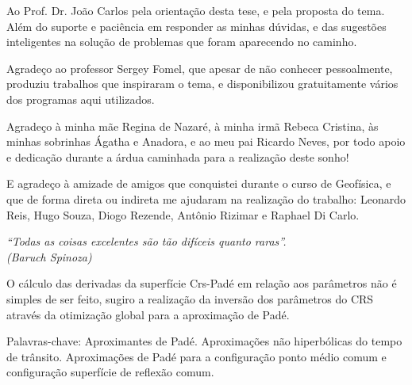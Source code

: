 \documentclass[
	12pt,				%
	openright,			%
	oneside,			%
	a4paper,			%
	english,			%
	brazil				%
	]{abntex2}
\begin{document}
\begin{agradecimentos}
\vspace*{1.5cm}

Ao Prof. Dr. João Carlos pela orientação desta tese, e pela proposta do tema. Além
do suporte e paciência em responder as minhas dúvidas, e das sugestões inteligentes na solução de problemas
que foram aparecendo no caminho.

Agradeço ao professor Sergey Fomel, que apesar de não conhecer pessoalmente, produziu trabalhos
que inspiraram o tema, e disponibilizou gratuitamente
vários
dos programas aqui utilizados.

Agradeço à minha mãe Regina de Nazaré,
à minha irmã Rebeca Cristina, às minhas sobrinhas Ágatha e Anadora, e ao meu pai Ricardo Neves, por todo apoio e dedicação
durante a árdua caminhada para a realização deste sonho!

E agradeço à amizade de amigos que conquistei durante o curso de Geofísica, e que de forma direta ou indireta
me ajudaram na realização do trabalho:
Leonardo Reis, Hugo Souza, Diogo Rezende, Antônio Rizimar e Raphael Di Carlo.

\end{agradecimentos}

\begin{epigrafe}
    \vspace*{\fill}
	\begin{flushright}
		\textit{``Todas as coisas excelentes são tão difíceis quanto raras''. \\
		(Baruch Spinoza)}
	\end{flushright}
\end{epigrafe}


\begin{resumo}
\OnehalfSpacing	%
O cálculo das derivadas da superfície Crs-Padé em relação aos parâmetros não é simples de ser feito,
sugiro a realização da inversão dos parâmetros do CRS através da otimização global para a aproximação de Padé.
 \vspace{\onelineskip} 
 \noindent
 \par Palavras-chave: Aproximantes de Padé. Aproximações não hiperbólicas do tempo de trânsito. Aproximações de Padé
 para a configuração ponto médio comum e configuração superfície de reflexão comum. 
\end{resumo}
\end{document}
